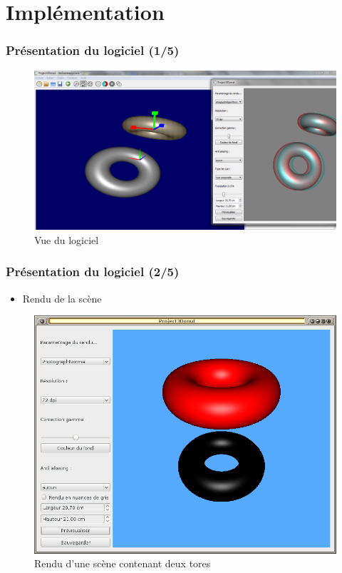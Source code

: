 \documentclass{beamer}
\begin{document}

\section{Implémentation}

\begin{frame}
\frametitle{Présentation du logiciel (1/5)}
\begin{figure}
\includegraphics[scale=0.22]{logiciel.png}
\caption{Vue du logiciel}
\end{figure}
\end{frame}

%
\begin{frame}
\frametitle{Présentation du logiciel (2/5)}
\begin{itemize}[label=$\bullet$]
\item Rendu de la scène
\end{itemize}
\begin{figure}
\centering
\includegraphics[scale=0.28]{rendu.png}
\caption{Rendu d'une scène contenant deux tores}
\end{figure}

\end{frame}
\end{document}
